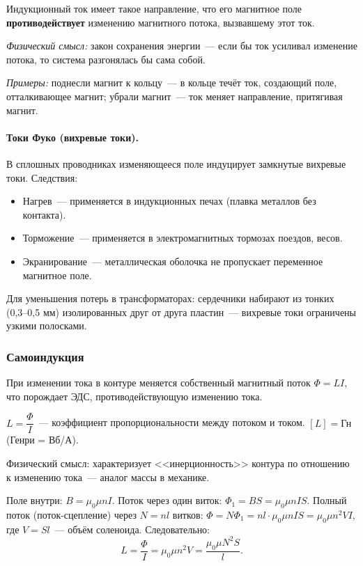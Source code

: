 \documentclass[12pt]{article}
\begin{document}
\begin{statement}
    Индукционный ток имеет такое направление, что его магнитное поле
    \textbf{противодействует} изменению магнитного потока, вызвавшему этот ток.

    \textit{Физический смысл:} закон сохранения энергии~--- если бы ток
    усиливал изменение потока, то система разгонялась бы сама собой.

    \textit{Примеры:} поднесли магнит к кольцу~--- в кольце течёт ток,
    создающий поле, отталкивающее магнит; убрали магнит~--- ток меняет
    направление, притягивая магнит.
\end{statement}

\paragraph{Токи Фуко (вихревые токи).}
В сплошных проводниках изменяющееся поле индуцирует замкнутые вихревые токи.
Следствия:
\begin{itemize}
    \item Нагрев~--- применяется в индукционных печах (плавка металлов без
          контакта).
    \item Торможение~--- применяется в электромагнитных тормозах поездов,
          весов.
    \item Экранирование~--- металлическая оболочка не пропускает переменное
          магнитное поле.
\end{itemize}
Для уменьшения потерь в трансформаторах: сердечники набирают из тонких
(0,3--0,5 мм) изолированных друг от друга пластин~--- вихревые токи ограничены
узкими полосками.

\subsubsection{Самоиндукция}

При изменении тока в контуре меняется собственный магнитный поток $\Phi = LI$,
что порождает ЭДС, противодействующую изменению тока.

\begin{definition}[Индуктивность]
    $L = \dfrac{\Phi}{I}$~--- коэффициент пропорциональности между потоком и
    током. $[L] = \text{Гн}$ (Генри = Вб/А).

    Физический смысл: характеризует <<инерционность>> контура по отношению к
    изменению тока~--- аналог массы в механике.
\end{definition}

\begin{definition}
    Поле внутри: $B = \mu_0\mu nI$. Поток через один виток: $\Phi_1 = BS =
    \mu_0\mu nIS$. Полный поток (поток-сцепление) через $N = nl$ витков:
    $\Phi = N\Phi_1 = nl\cdot\mu_0\mu nIS = \mu_0\mu n^2 V I$, где $V = Sl$~---
    объём соленоида. Следовательно:
    \[
        \boxed{L = \frac{\Phi}{I} = \mu_0\mu n^2 V = \frac{\mu_0\mu N^2 S}{l}.}
    \]
\end{definition}
\end{document}
